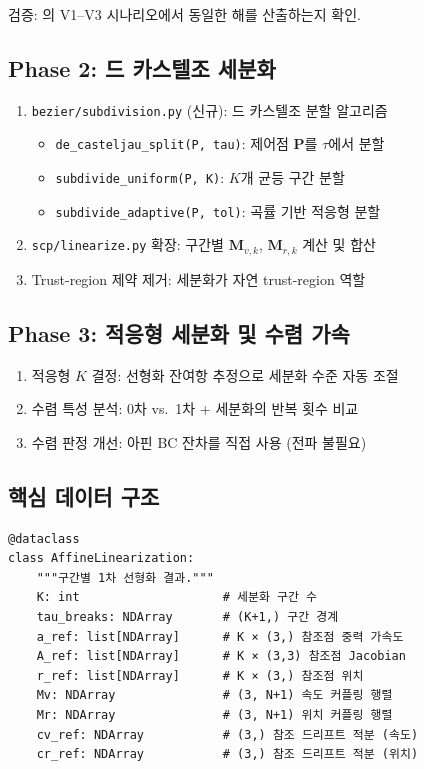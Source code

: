 \documentclass[11pt]{article}
\begin{document}
검증: \cite{report008}의 V1--V3 시나리오에서 동일한 해를 산출하는지 확인.

\subsection{Phase 2: 드 카스텔조 세분화}

\begin{enumerate}
  \item \texttt{bezier/subdivision.py} (신규): 드 카스텔조 분할 알고리즘
    \begin{itemize}
      \item \texttt{de\_casteljau\_split(P, tau)}: 제어점 $\mathbf{P}$를 $\tau$에서 분할
      \item \texttt{subdivide\_uniform(P, K)}: $K$개 균등 구간 분할
      \item \texttt{subdivide\_adaptive(P, tol)}: 곡률 기반 적응형 분할
    \end{itemize}
  \item \texttt{scp/linearize.py} 확장: 구간별 $\mathbf{M}_{v,k}$, $\mathbf{M}_{r,k}$ 계산 및 합산
  \item Trust-region 제약 제거: 세분화가 자연 trust-region 역할
\end{enumerate}

\subsection{Phase 3: 적응형 세분화 및 수렴 가속}

\begin{enumerate}
  \item 적응형 $K$ 결정: 선형화 잔여항 추정으로 세분화 수준 자동 조절
  \item 수렴 특성 분석: 0차 vs.\ 1차 + 세분화의 반복 횟수 비교
  \item 수렴 판정 개선: 아핀 BC 잔차를 직접 사용 (전파 불필요)
\end{enumerate}

\subsection{핵심 데이터 구조}

\begin{verbatim}
@dataclass
class AffineLinearization:
    """구간별 1차 선형화 결과."""
    K: int                    # 세분화 구간 수
    tau_breaks: NDArray       # (K+1,) 구간 경계
    a_ref: list[NDArray]      # K × (3,) 참조점 중력 가속도
    A_ref: list[NDArray]      # K × (3,3) 참조점 Jacobian
    r_ref: list[NDArray]      # K × (3,) 참조점 위치
    Mv: NDArray               # (3, N+1) 속도 커플링 행렬
    Mr: NDArray               # (3, N+1) 위치 커플링 행렬
    cv_ref: NDArray           # (3,) 참조 드리프트 적분 (속도)
    cr_ref: NDArray           # (3,) 참조 드리프트 적분 (위치)
\end{verbatim}
\end{document}
